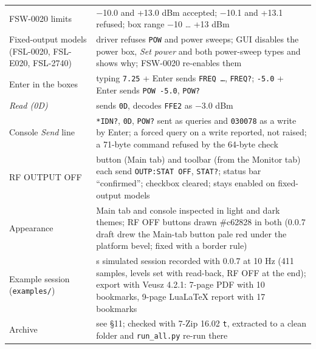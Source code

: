 \documentclass[
\directlua{luaotfload.add_fallback("qsfallback", {"DejaVu Sans:mode=harf;", "DejaVu Sans Mono:mode=harf;", "DejaVu Math TeX Gyre:mode=harf;"})}
  10pt,
  letterpaper,
]{article}
\begin{document}
\begin{longtable}[]{@{}
  >{\raggedright\arraybackslash}p{}
  >{\raggedright\arraybackslash}p{}@{}}
FSW-0020 limits & −10.0 and +13.0 dBm accepted; −10.1 and +13.1 refused;
box range −10 \ldots{} +13 dBm \\
Fixed-output models (FSL-0020, FSL-E020, FSL-2740) & driver refuses
\texttt{POW} and power sweeps; GUI disables the power box, \emph{Set
power} and both power-sweep types and shows why; FSW-0020 re-enables
them \\
Enter in the boxes & typing \texttt{7.25} + Enter sends
\texttt{FREQ\ …}, \texttt{FREQ?}; \texttt{-5.0} + Enter sends
\texttt{POW\ -5.0}, \texttt{POW?} \\
\emph{Read (0D)} & sends \texttt{0D}, decodes \texttt{FFE2} as −3.0
dBm \\
Console \emph{Send} line & \texttt{*IDN?}, \texttt{0D}, \texttt{POW?}
sent as queries and \texttt{030078} as a write by Enter; a forced query
on a write reported, not raised; a 71-byte command refused by the
64-byte check \\
RF OUTPUT OFF & button (Main tab) and toolbar (from the Monitor tab)
each send \texttt{OUTP:STAT\ OFF}, \texttt{STAT?}; status bar
``confirmed''; checkbox cleared; stays enabled on fixed-output models \\
Appearance & Main tab and console inspected in light and dark themes; RF
OFF buttons drawn \#c62828 in both (0.0.7 draft drew the Main-tab button
pale red under the platform bevel; fixed with a border rule) \\
Example session (\texttt{examples/}) & 41 s simulated session recorded
with 0.0.7 at 10 Hz (411 samples, levels set with read-back, RF OFF at
the end); export with Veusz 4.2.1: 7-page PDF with 10 bookmarks, 9-page
LuaLaTeX report with 17 bookmarks \\
Archive & see §11; checked with 7-Zip 16.02 \texttt{t}, extracted to a
clean folder and \texttt{run\_all.py} re-run there \\
\end{longtable}
\end{document}
